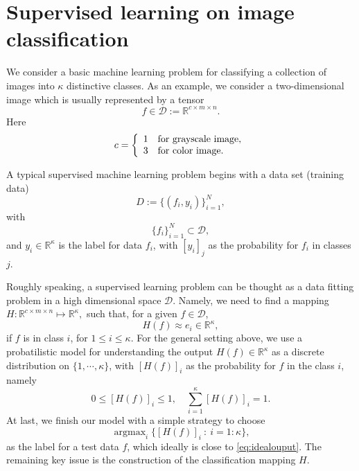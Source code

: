 \section{Supervised learning on image classification}\label{sec:MLbasics}
We consider a basic machine learning problem for classifying a
collection of images into $\kappa$ distinctive classes.  As an
example, we consider a two-dimensional image which is usually
represented by a tensor
$$
f\in  {\mathcal D} := \mathbb{R}^{c \times m\times n}.
$$
Here 
\begin{equation}
\label{data-c}
c=
\left\{
\begin{array}[rl]{rl}
1 & \mbox{for grayscale image},\\    
3 & \mbox{for color image}.
\end{array}
\right.
\end{equation}

A typical supervised machine learning problem begins with a data set (training data)
$$
D := \{(f_i, y_i)\}_{i=1}^N,
$$ 
with
$$
\{f_i\}_{i=1}^N \subset {\mathcal D},
$$
and $y_i \in \mathbb{R}^{\kappa}$ is the label for data $f_i$, with
$[y_i]_j$ as the probability for $f_i$ in classes $j$. 


Roughly speaking, a supervised learning problem can be thought as a data fitting
problem in a high dimensional space ${\mathcal D}$.
Namely, we need to find a mapping
$H:  \mathbb R^{c\times m\times n}\mapsto \mathbb R^\kappa,$
such that, for a given $f\in  {\mathcal D}$, 
\begin{equation}\label{eq:idealouput}
H(f)\approx e_i\in \mathbb R^\kappa,
\end{equation}
if $f$ is in class $i$, for $1\le i\le \kappa$. 
For the general setting above, we use a probatilistic model for understanding the
output $H(f) \in \mathbb{R}^{\kappa}$ as a discrete 
distribution on $\{1, \cdots,\kappa\}$, with $[H (f)]_i$ as the probability
for $f$ in the class $i$, namely
\begin{equation}
\label{distrib}
0 \le [H(f)]_i \le 1,\quad 
\sum_{i=1}^\kappa  [H(f)]_i=1. 
\end{equation}
At last, we finish our model with a simple strategy to choose
\begin{equation}\label{eq:maxchoose}
\mathop{\arg\max}_{i}\{[H(f)]_i~:~ i = 1:\kappa\},
\end{equation}
as the label for a test data $f$, which ideally is close to
\eqref{eq:idealouput}.  The remaining key issue is the construction of
the classification mapping $H$.


